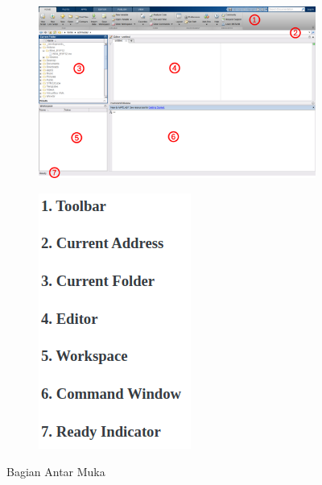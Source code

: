 \documentclass[12pt]{book}
\begin{document}
	\begin{figure}[!ht]
		\centering
		\begin{subfigure}[b]{0.75\textwidth}
			\includegraphics[width=\textwidth]{images/matlabiface}
		\end{subfigure}
		\begin{subfigure}[b]{0.2\textwidth}
			\includegraphics[width=\textwidth]{images/matlabpart}
		\end{subfigure}
		\caption{Bagian Antar Muka}
	\end{figure}
	
\end{document}
